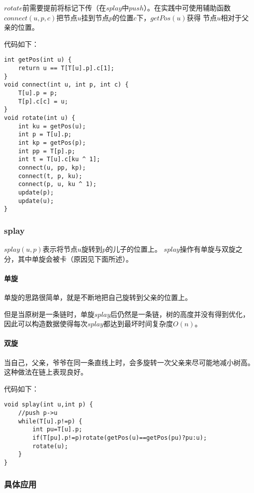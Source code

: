 $rotate$前需要提前将标记下传（在$splay$中$push$）。在实践中可使用辅助函数
$connect(u,p,c)$把节点$u$挂到节点$p$的位置$c$下，$getPos(u)$获得
节点$u$相对于父亲的位置。

代码如下：

\begin{lstlisting}[title=rotate]
int getPos(int u) {
    return u == T[T[u].p].c[1];
}
void connect(int u, int p, int c) {
    T[u].p = p;
    T[p].c[c] = u;
}
void rotate(int u) {
    int ku = getPos(u);
    int p = T[u].p;
    int kp = getPos(p);
    int pp = T[p].p;
    int t = T[u].c[ku ^ 1];
    connect(u, pp, kp);
    connect(t, p, ku);
    connect(p, u, ku ^ 1);
    update(p);
    update(u);
}
\end{lstlisting}

\subsubsection{splay}

$splay(u,p)$表示将节点$u$旋转到$p$的儿子的位置上。
$splay$操作有单旋与双旋之分，其中单旋会被卡（原因见下面所述）。

\paragraph{单旋}

单旋的思路很简单，就是不断地把自己旋转到父亲的位置上。

但是当原树是一条链时，单旋$splay$后仍然是一条链，树的高度并没有得到优化，
因此可以构造数据使得每次$splay$都达到最坏时间复杂度$O(n)$。

\paragraph{双旋}

当自己，父亲，爷爷在同一条直线上时，会多旋转一次父亲来尽可能地减小树高。
这种做法在链上表现良好。

代码如下：

\begin{lstlisting}[title=splay]
void splay(int u,int p) {
    //push p->u
    while(T[u].p!=p) {
        int pu=T[u].p;
        if(T[pu].p!=p)rotate(getPos(u)==getPos(pu)?pu:u);
        rotate(u);
    }
}
\end{lstlisting}

\subsubsection{具体应用}

